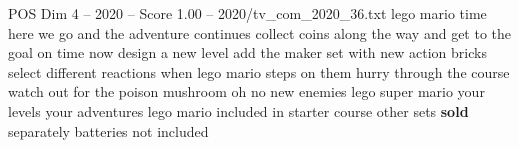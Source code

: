 \begin{textsample}{POS Dim 4 – 2020 – Score 1.00 – 2020/tv\_com\_2020\_36.txt}  \label{ex:f4_pos_042}
lego mario time here we go and the adventure continues collect coins along the way and get to the goal on time now design a new level add the maker set with new action bricks select different reactions when lego mario steps on them hurry through the course watch out for the poison mushroom oh no new enemies lego super mario your levels your adventures lego mario included in starter course other sets \textbf{sold} separately batteries not included

\end{textsample}
